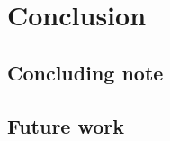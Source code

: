 \documentclass[../main.tex]{subfiles}
\begin{document}
\section{Conclusion}\label{section:conclusion}
\subsection{Concluding note}
\subsection{Future work}


\biblio
\end{document}
